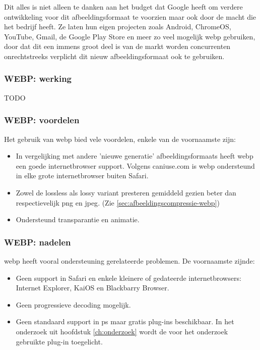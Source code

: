Dit alles is niet alleen te danken aan het budget dat Google heeft om verdere ontwikkeling voor dit \gls{afbeeldingsformaat} te voorzien maar ook door de macht die het bedrijf heeft. Ze laten hun eigen projecten zoals Android, ChromeOS, YouTube, Gmail, de Google Play Store en meer zo veel mogelijk \gls{webp} gebruiken, door dat dit een immens groot deel is van de markt worden concurrenten onrechtstreeks verplicht dit nieuw \gls{afbeeldingsformaat} ook te gebruiken.

\subsubsection{WEBP: werking}
\label{sec:afbeeldingscompressie-webp-werking}

TODO


\subsubsection{WEBP: voordelen}
\label{sec:afbeeldingscompressie-webp-voordelen}

Het gebruik van \gls{webp} bied vele voordelen, enkele van de voornaamste zijn:

\begin{itemize}
	\item In vergelijking met andere 'nieuwe generatie' \glspl{afbeeldingsformaat} heeft \gls{webp} een goede internetbrowser support. Volgens caniuse.com is \gls{webp} ondersteund in elke grote internetbrowser buiten Safari.
	
	\item Zowel de \gls{lossless} als \gls{lossy} variant presteren gemiddeld gezien beter dan respectievelijk \gls{png} en \gls{jpeg}. (Zie \ref{sec:afbeeldingscompressie-webp})
	
	\item Ondersteund transparantie en animatie.
\end{itemize}

\subsubsection{WEBP: nadelen}
\label{sec:afbeeldingscompressie-webp-nadelen}

\Gls{webp} heeft vooral ondersteuning gerelateerde problemen. De voornaamste zijnde:

\begin{itemize}
	\item Geen support in Safari en enkele kleinere of gedateerde internetbrowsers: Internet Explorer, KaiOS en Blackbarry Browser.
	
	\item Geen progressieve \gls{decoding} mogelijk.
	
	\item Geen standaard support in \gls{ps} maar gratis \glspl{plug-in} beschikbaar. In het onderzoek uit hoofdstuk \ref{ch:onderzoek} wordt de voor het onderzoek gebruikte \gls{plug-in} toegelicht.
\end{itemize}

